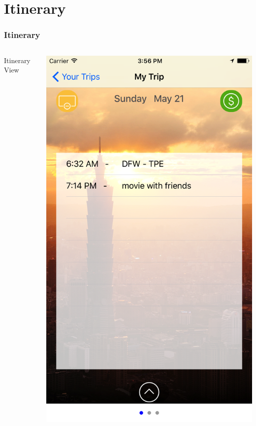 \documentclass{beamer}
\begin{document}
\section{Itinerary}
\begin{frame}
\frametitle{Itinerary}
\begin{columns}
    \begin{column}{0.3\textwidth}
        Itinerary View
    \end{column}
    \begin{column}{0.3\textwidth}  %
        \begin{center}
            \includegraphics[scale=0.08]{itinerary1}

\end{center}
\end{column}
\end{columns}
\end{frame}
\end{document}
